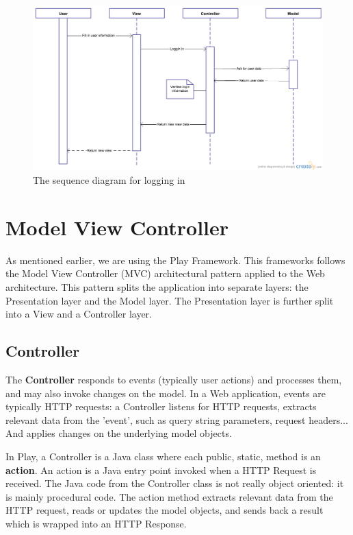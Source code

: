 \begin{figure}[H]
    \centering
    \captionsetup{justification=centering}
    \includegraphics[width=\textwidth, frame]{images/sequence_login}
    \caption{The sequence diagram for logging in}
    \label{sequence_login}
\end{figure}

\section{Model View Controller}
\label{sec:mvc}
As mentioned earlier, we are using the Play Framework. 
This frameworks follows the Model View Controller (MVC) architectural pattern applied to the Web architecture\cite{playframework_mvc}.
This pattern splits the application into separate layers: the Presentation layer and the Model layer. 
The Presentation layer is further split into a View and a Controller layer.

\subsection{Controller}
The \textbf{Controller} responds to events (typically user actions) and processes them, and may also invoke changes on the model.
In a Web application, events are typically HTTP requests: a Controller listens for HTTP requests, extracts relevant data from the 'event', such as query string parameters, request headers... 
And applies changes on the underlying model objects.

In Play, a Controller is a Java class where each public, static, method is an \textbf{action}.
An action is a Java entry point invoked when a HTTP Request is received.
The Java code from the Controller class is not really object oriented: it is mainly procedural code.
The action method extracts relevant data from the HTTP request, reads or updates the model objects, and sends back a result which is wrapped into an HTTP Response.

